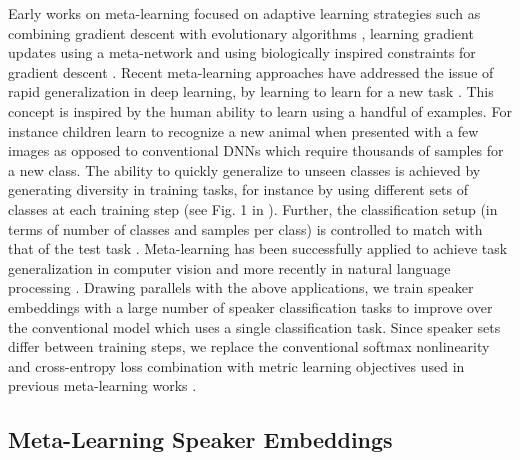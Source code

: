 Early works on meta-learning focused on adaptive learning strategies such as combining gradient descent with evolutionary algorithms \cite{yao_evolve1999,ABRAHAM20041}, learning gradient updates using a meta-network \cite{naik_metaNN1992} and using biologically inspired constraints for gradient descent \cite{bengio_synaptic1991, bengio1992optimization}.
Recent meta-learning approaches have addressed the issue of rapid generalization in deep learning, by learning to learn for a new task \cite{Andrychowicz_2016, finn_maml2017, ravi2017}.
This concept is inspired by the human ability to learn using a handful of examples. For instance children learn to recognize a new animal when presented with a few images as opposed to conventional DNNs which require thousands of samples for a new class.
The ability to quickly generalize to unseen classes is achieved by generating diversity in training tasks, for instance by using different sets of classes at each training step (see Fig. 1 in \cite{ravi2017}). Further, the classification setup (in terms of number of classes and samples per class) is controlled to match with that of the test task \cite{snell2017prototypical}.
Meta-learning has been successfully applied to achieve task generalization in computer vision \cite{ravi2017,snell2017prototypical,finn_maml2017} and more recently in natural language processing \cite{yu2018diverse,GaoH0S19, dou-etal-2019-investigating}.
Drawing parallels with the above applications, we train speaker embeddings with a large number of speaker classification tasks to improve over the conventional model which uses a single classification task. Since speaker sets differ between training steps, we replace the conventional softmax nonlinearity and cross-entropy loss combination with metric learning objectives used in previous meta-learning works \cite{snell2017prototypical,sung2018learning,vinyals2016matching,geng2019induction}.


\subsection{Meta-Learning Speaker Embeddings}

